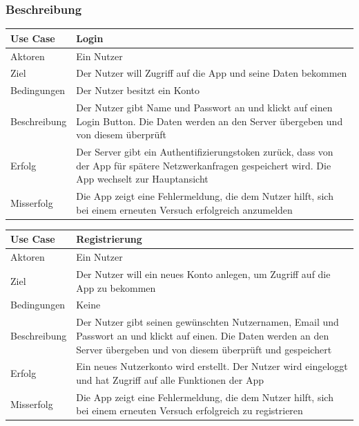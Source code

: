 \subsubsection{Beschreibung}
\begin{tabular}{|p{}|p{}|}
\hline
\textbf{Use Case} & \textbf{Login}  \\ \hline
Aktoren &  Ein Nutzer \\ \hline
Ziel &  Der Nutzer will Zugriff auf die App und seine Daten bekommen \\ \hline
Bedingungen &  Der Nutzer besitzt ein Konto \\ \hline
Beschreibung &  Der Nutzer gibt Name und Passwort an und klickt auf einen Login Button. Die Daten werden an den Server übergeben und von diesem überprüft \\ \hline
Erfolg & Der Server gibt ein Authentifizierungstoken zurück, dass von der App für spätere Netzwerkanfragen gespeichert wird. Die App wechselt zur Hauptansicht  \\ \hline
Misserfolg & Die App zeigt eine Fehlermeldung, die dem Nutzer hilft, sich bei einem erneuten Versuch erfolgreich anzumelden \\ \hline
\hline \end{tabular}
\begin{tabular}{|p{}|p{}|}
\hline
\textbf{Use Case} & \textbf{Registrierung} \\ \hline
Aktoren &  Ein Nutzer \\  \hline
Ziel &  Der Nutzer will ein neues Konto anlegen, um Zugriff auf die App zu bekommen \\ \hline
Bedingungen &  Keine \\ \hline
Beschreibung &  Der Nutzer gibt seinen gewünschten Nutzernamen, Email und Passwort an und klickt auf einen. Die Daten werden an den Server übergeben und von diesem überprüft und gespeichert \\ \hline
Erfolg & Ein neues Nutzerkonto wird erstellt. Der Nutzer wird eingeloggt und hat Zugriff auf alle Funktionen der App \\ \hline
Misserfolg & Die App zeigt eine Fehlermeldung, die dem Nutzer hilft, sich bei einem erneuten Versuch erfolgreich zu registrieren \\ \hline
\hline \end{tabular}
